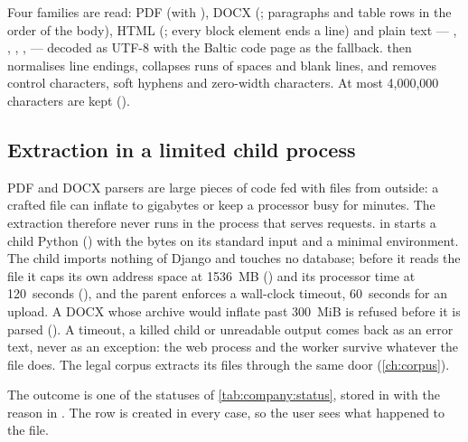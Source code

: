 Four families are read: PDF (with ), DOCX (; paragraphs and
table rows in the order of the body), HTML (; every block element ends a line) and
plain text --- , , , ,  --- decoded
as UTF-8 with the Baltic code page  as the fallback.  then
normalises line endings, collapses runs of spaces and blank lines, and removes control
characters, soft hyphens and zero-width characters. At most 4,000,000 characters are kept
().

\subsection{Extraction in a limited child process}\label{sec:company:sandbox}

PDF and DOCX parsers are large pieces of code fed with files from outside: a crafted file can
inflate to gigabytes or keep a processor busy for minutes. The extraction therefore never runs
in the process that serves requests.  in
 starts a child Python () with the bytes
on its standard input and a minimal environment. The child imports nothing of Django and
touches no database; before it reads the file it caps its own address space at 1536~MB
() and its processor time at 120~seconds (), and the
parent enforces a wall-clock timeout, 60~seconds for an upload. A DOCX whose archive would
inflate past 300~MiB is refused before it is parsed (). A timeout, a
killed child or unreadable output comes back as an error text, never as an exception: the web
process and the worker survive whatever the file does. The legal corpus extracts its files
through the same door (\cref{ch:corpus}).

The outcome is one of the statuses of \cref{tab:company:status}, stored in
 with the reason in . The row is created in
every case, so the user sees what happened to the file.

